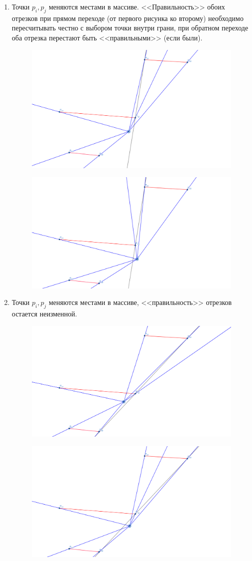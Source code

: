 \documentclass[letterpaper,12pt]{article}
\begin{document}
\begin{enumerate}
\begin{figure}[H]
            \end{figure}
      \item Точки $p_i, p_j$ меняются местами в массиве. <<Правильность>>
            обоих отрезков при прямом переходе (от первого рисунка ко второму)
            необходимо пересчитывать честно с выбором точки внутри грани, %
            при обратном переходе оба отрезка перестают быть <<правильными>>
            (если были).
            \begin{figure}[H]
            \centering
            \includegraphics[width=0.5\linewidth]{one_side_1_1.png}
            \end{figure}
            \begin{figure}[H]
            \centering
            \includegraphics[width=0.5\linewidth]{one_side_1_2.png}
            \end{figure}
      \item Точки $p_i, p_j$ меняются местами в массиве, <<правильность>>
            отрезков остается неизменной.
            \begin{figure}[H]
            \centering
            \includegraphics[width=0.5\linewidth]{one_side_2_1.png}
            \end{figure}
            \begin{figure}[H]
            \centering
            \includegraphics[width=0.5\linewidth]{one_side_2_2.png}

\end{figure}
\end{enumerate}
\end{document}
